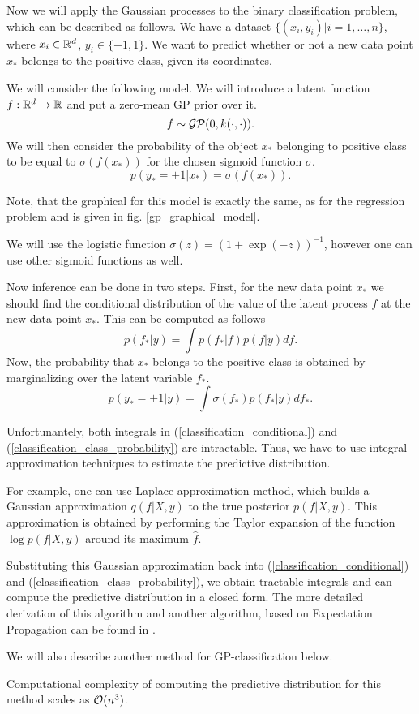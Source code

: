 \label{gp-classification}
Now we will apply the Gaussian processes to the binary classification problem, which can be described as follows. We have a dataset $\{(x_i, y_i) | i = 1, \ldots, n\}$, where $x_i \in \mathbb{R}^d$, $y_i \in \{-1, 1\}$. We want to predict whether or not a new data point $x_*$ belongs to the positive class, given its coordinates.

We will consider the following model. We will introduce a latent function $f: \mathbb{R}^d \rightarrow \mathbb{R}$ and put a zero-mean GP prior over it. 
$$f \sim \mathcal{GP}(0, k(\cdot, \cdot)).$$
We will then consider the probability of the object $x_*$ belonging to positive class to be equal to $\sigma(f(x_*))$ for the chosen sigmoid function $\sigma$.
$$p(y_* = +1 | x_*) = \sigma(f(x_*)).$$

Note, that the graphical for this model is exactly the same, as for the regression problem and is given in fig. \ref{gp_graphical_model}.

We will use the logistic function $\sigma(z) = (1 + \exp(-z))^{-1}$, however one can use other sigmoid functions as well.

Now inference can be done in two steps. First, for the new data point $x_*$ we should find the conditional distribution of the value of the latent process $f$ at the new data point $x_*$. This can be computed as follows
\begin{equation}
	\label{classification_conditional}
	p(f_* | y) = \int p(f_* | f) p(f | y) df.
\end{equation}
Now, the probability that $x_*$ belongs to the positive class is obtained by marginalizing over the latent variable $f_*$.
\begin{equation}
	\label{classification_class_probability}
	p(y_* = +1 | y) = \int \sigma(f_*) p(f_* | y) df_*.
\end{equation}

Unfortunantely, both integrals in (\ref{classification_conditional}) and (\ref{classification_class_probability}) are intractable. Thus, we have to use integral-approximation techniques to estimate the predictive distribution. 

For example, one can use Laplace approximation method, which builds a Gaussian approximation $q(f | X, y)$ to the true posterior $p(f | X, y)$. This approximation is obtained by performing the Taylor expansion of the function $\log p(f | X, y)$ around its maximum $\hat f$. 

Substituting this Gaussian approximation back into (\ref{classification_conditional}) and (\ref{classification_class_probability}), we obtain tractable integrals and can compute the predictive distribution in a closed form. The more detailed derivation of this algorithm and another algorithm, based on Expectation Propagation can be found in \cite{GPinML}.

We will also describe another method for GP-classification below.

Computational complexity of computing the predictive distribution for this method scales as $\mathcal{O}(n^3)$.